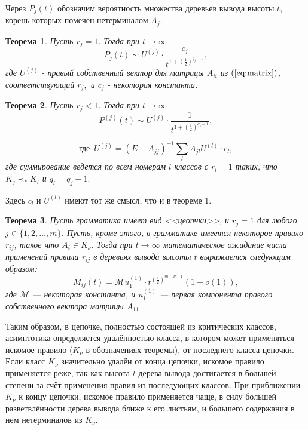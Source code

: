 \documentclass{article}
\newtheorem{theorem}{Теорема}
\begin{document}
Через $P_j(t)$ обозначим вероятность множества деревьев вывода высоты $t$, корень которых помечен нетерминалом $A_j$.

\begin{theorem}
	Пусть $r_j=1.$ Тогда при $t \rightarrow \infty$ 
	\begin{equation*}
		P_j(t)\sim U^{(j)} \cdot \frac {c_j}{ t^{1+\left(\frac{1}{2}\right)^{q_j-1}}},  
	\end{equation*}
	где $U^{(j)}$ - правый собственный вектор для матрицы $A_{ii}$ из $(\ref{eq:matrix})$, соответствующий $r_j,$ 
	и $c_j$ - некоторая константа.
\end{theorem}

\begin{theorem}
	Пусть $r_j<1.$ Тогда при $t \rightarrow \infty$ 
	\begin{equation*}
		P^{(j)}(t)\sim U^{(j)} \cdot \frac {1}{ t^{1+\left(\frac{1}{2}\right)^{q_j-1}}},  
	\end{equation*}
	
	\begin{equation*}
		\mbox{где}\, \, \,  U^{(j)}= \left(E-A_{jj}\right)^{-1}\sum_l A_{jl}U^{(l)}\cdot c_l,
	\end{equation*}
	где суммирование ведется по всем номерам $l$ классов с $r_l=1$ таких, что $K_j \prec_* K_l$ и $q_l=q_j-1.$
\end{theorem}

Здесь $c_l$ и $U^{(l)}$ имеют тот же смысл, что и в теореме 1.

\begin{theorem}
    Пусть грамматика имеет вид <<цеопчки>>, и $r_j = 1$ для любого $j \in \{1,2,\ldots,m\}$. Пусть, кроме этого, в грамматике имеется некоторое правило $r_{ij}$, такое что $A_i \in K_\nu$. Тогда при $t \rightarrow \infty$ математическое ожидание числа применений правила $r_{ij}$ в деревьях вывода высоты $t$ выражается следующим образом:
    \begin{equation}
        M_{ij}(t) = \mathcal{M} u^{(1)}_1 \cdot t^{ \left( \frac{1}{2} \right)^{m - \nu - 1} } (1 + o(1)),
    \end{equation}
    где $\mathcal{M}$ --- некоторая константа, и $u^{(1)}_1$ --- первая компонента правого собственного вектора матрицы $A_{11}$.
\end{theorem}

Таким образом, в цепочке, полностью состоящей из критических классов, асимптотика определяется удалённостью класса, в котором может применяться искомое правило ($K_\nu$ в обозначениях теоремы), от последнего класса цепочки. Если класс $K_\nu$ значительно удалён от конца цепочки, искомое правило применяется реже, так как высота $t$ дерева вывода достигается в большей степени за счёт применения правил из последующих классов. При приближении $K_\nu$ к концу цепочки, искомое правило применяется чаще, в силу большей разветвлённости дерева вывода ближе к его листьям, и большего содержания в нём нетерминалов из $K_\nu$.
\end{document}
